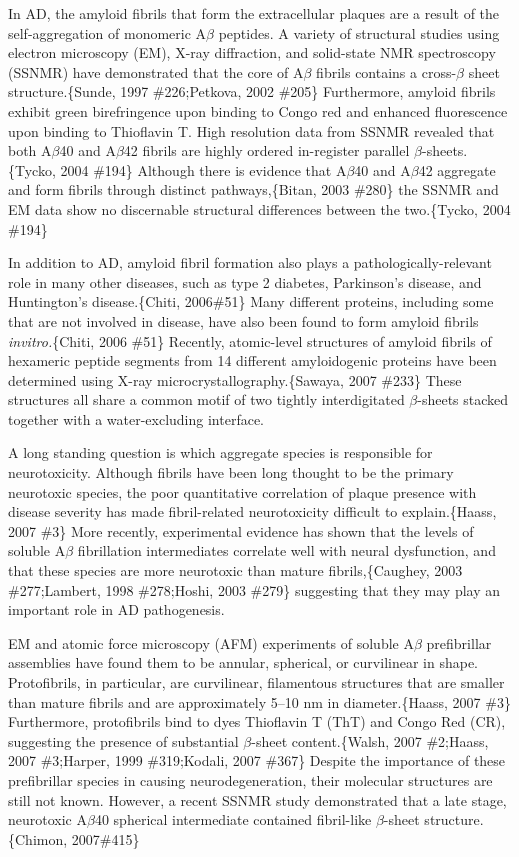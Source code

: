 In AD, the amyloid fibrils that form the extracellular plaques are a result of the self-aggregation of monomeric A$\beta$ peptides. A variety of structural studies using electron microscopy (EM), X-ray diffraction, and solid-state NMR spectroscopy (SSNMR) have demonstrated that the core of A$\beta$ fibrils contains a cross-$\beta$ sheet structure.\{Sunde, 1997 \#226;Petkova, 2002 \#205\} Furthermore, amyloid fibrils exhibit green birefringence upon binding to Congo red and enhanced fluorescence upon binding to Thioflavin T. High resolution data from SSNMR revealed that both A$\beta$40 and A$\beta$42 fibrils are highly ordered in-register parallel $\beta$-sheets.\{Tycko, 2004 \#194\} Although there is evidence that A$\beta$40 and A$\beta$42 aggregate and form fibrils through distinct pathways,\{Bitan, 2003 \#280\} the SSNMR and EM data show no discernable structural differences between the two.\{Tycko, 2004 \#194\}

In addition to AD, amyloid fibril formation also plays a pathologically-relevant role in many other diseases, such as type 2 diabetes, Parkinson's disease, and Huntington's disease.\{Chiti, 2006\#51\} Many different proteins, including some that are not involved in
disease, have also been found to form amyloid fibrils \emph{invitro.}\{Chiti, 2006 \#51\} Recently, atomic-level structures of amyloid
fibrils of hexameric peptide segments from 14 different amyloidogenic proteins have been determined using X-ray microcrystallography.\{Sawaya, 2007 \#233\} These structures all share a common motif of two tightly interdigitated $\beta$-sheets stacked together with a water-excluding interface.

A long standing question is which aggregate species is responsible for neurotoxicity. Although fibrils have been long thought to be the primary neurotoxic species, the poor quantitative correlation of plaque presence with disease severity has made fibril-related neurotoxicity difficult to explain.\{Haass, 2007 \#3\} More recently, experimental evidence has shown that the levels of soluble A$\beta$ fibrillation intermediates correlate well with neural dysfunction, and that these species are more neurotoxic than mature fibrils,\{Caughey, 2003 \#277;Lambert, 1998 \#278;Hoshi, 2003 \#279\} suggesting that they may play an important role in AD pathogenesis.

EM and atomic force microscopy (AFM) experiments of soluble A$\beta$ prefibrillar assemblies have found them to be annular, spherical, or curvilinear in shape. Protofibrils, in particular, are curvilinear, filamentous structures that are smaller than mature fibrils and are approximately 5--10 nm in diameter.\{Haass, 2007 \#3\} Furthermore, protofibrils bind to dyes Thioflavin T (ThT) and Congo Red (CR), suggesting the presence of substantial $\beta$-sheet content.\{Walsh, 2007 \#2;Haass, 2007 \#3;Harper, 1999 \#319;Kodali, 2007 \#367\} Despite the importance of these prefibrillar species in causing neurodegeneration, their molecular structures are still not known. However, a recent SSNMR study demonstrated that a late stage, neurotoxic A$\beta$40 spherical intermediate contained fibril-like $\beta$-sheet structure.\{Chimon, 2007\#415\}

